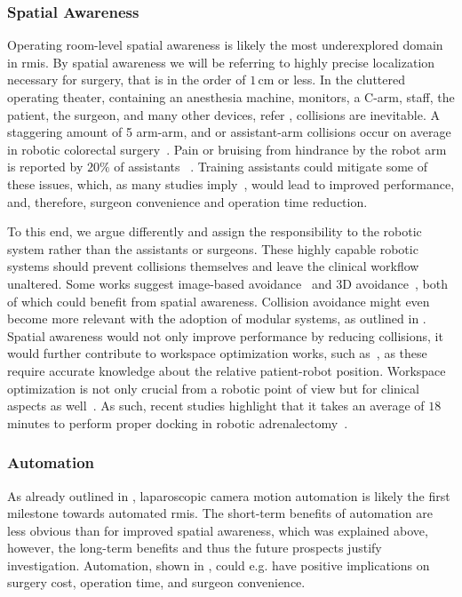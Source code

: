 \subsubsection{Spatial Awareness}
\label{in:sec:spatial_awareness}
Operating room-level spatial awareness is likely the most underexplored domain in \gls{rmis}. By spatial awareness we will be referring to highly precise localization necessary for surgery, that is in the order of $1\,\text{cm}$ or less. In the cluttered operating theater, containing an anesthesia machine, monitors, a C-arm, staff, the patient, the surgeon, and many other devices, refer , collisions are inevitable. A staggering amount of 5 arm-arm, and or assistant-arm collisions occur on average in robotic colorectal surgery~\cite{wong2023improving}. Pain or bruising from hindrance by the robot arm is reported by $20\%$ of assistants ~\cite{van2019ergonomic}. Training assistants could mitigate some of these issues, which, as many studies imply~\cite{cimen2019does, mitsinikos2017does, kwon2020impact}, would lead to improved performance, and, therefore, surgeon convenience and operation time reduction. 

To this end, we argue differently and assign the responsibility to the robotic system rather than the assistants or surgeons. These highly capable robotic systems should prevent collisions themselves and leave the clinical workflow unaltered. Some works suggest image-based avoidance~\cite{hameed2016towards} and 3D avoidance~\cite{li2023three}, both of which could benefit from spatial awareness. Collision avoidance might even become more relevant with the adoption of modular systems, as outlined in . Spatial awareness would not only improve performance by reducing collisions, it would further contribute to workspace optimization works, such as~\cite{hutzl2015knowledge, zelechowski2023automatic}, as these require accurate knowledge about the relative patient-robot position. Workspace optimization is not only crucial from a robotic point of view but for clinical aspects as well~\cite{alhusseinawi2023validation}. As such, recent studies highlight that it takes an average of $18$ minutes to perform proper docking in robotic adrenalectomy~\cite{feng2020robot}.

\subsubsection{Automation}
\label{in:sec:automation}
As already outlined in , laparoscopic camera motion automation is likely the first milestone towards automated \gls{rmis}. The short-term benefits of automation are less obvious than for improved spatial awareness, which was explained above, however, the long-term benefits and thus the future prospects justify investigation. Automation, shown in , could e.g. have positive implications on surgery cost, operation time, and surgeon convenience.


